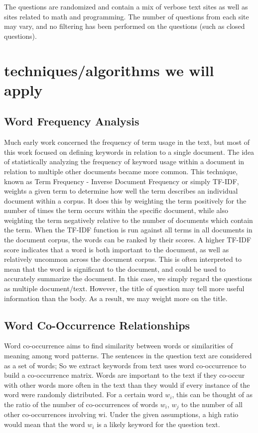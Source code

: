 \documentclass[11pt]{article} %
\begin{document}
The questions are randomized and contain a mix of verbose text sites as well as sites related to math and programming. The number of questions from each site may vary, and no filtering has been performed on the questions (such as closed questions).


\section{techniques/algorithms we will apply}
\subsection{Word Frequency Analysis}
Much early work concerned the frequency of term usage in the text, but most of this work focused on defining keywords in relation to a single document. 
The idea of statistically analyzing the frequency of keyword usage within a document in relation to multiple other documents became more common. This technique, known as Term Frequency - Inverse Document Frequency or simply TF-IDF, weights a given term to determine how well the term describes an individual document within a corpus.
 It does this by weighting the term positively for the number of times the term occurs within the specific document, while also weighting the term negatively relative to the number of documents which contain the term. When the TF-IDF function is run against all terms in all documents in the document corpus, the words can be ranked by their scores. A higher TF-IDF score indicates that a word is both important to the document, as well as relatively uncommon across the document corpus. This is often interpreted to mean that the word is significant to the document, and could be used to accurately summarize the document. In this case, we simply regard the questions as multiple document/text. However, the title of question may tell more useful information than the body. As a result, we may weight more on the title.

\subsection{Word Co-Occurrence Relationships}
Word co-occurrence aims to find similarity between words or similarities of meaning among word patterns. The sentences in the question text are considered as a set of words; So we extract keywords from text uses word co-occurrence to build a co-occurrence matrix. Words are important to the text if they co-occur with other words more often in the text than they would if every instance of the word were randomly distributed. For a certain word $w_i$, this can be thought of as the ratio of the number of co-occurrences of words $w_i$, $w_j$ to the number of all other co-occurrences involving wi. Under the given assumptions, a high ratio would mean that the word $w_i$ is a likely keyword for the question text.
\end{document}
